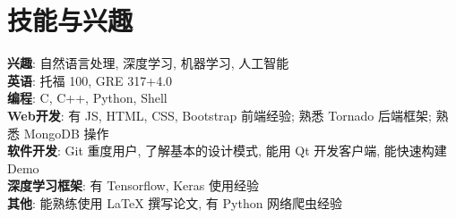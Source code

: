 \section{技能与兴趣}
\textbf{兴趣}: 自然语言处理, 深度学习, 机器学习, 人工智能\\
\textbf{英语}: 托福 100, GRE 317+4.0\\
\textbf{编程}: C, C++, Python, Shell\\
\textbf{Web开发}: 有 JS, HTML, CSS, Bootstrap 前端经验; 熟悉 Tornado 后端框架; 熟悉 MongoDB 操作\\
\textbf{软件开发}: Git 重度用户, 了解基本的设计模式, 能用 Qt 开发客户端, 能快速构建 Demo\\
\textbf{深度学习框架}: 有 Tensorflow, Keras 使用经验\\
\textbf{其他}: 能熟练使用 LaTeX 撰写论文, 有 Python 网络爬虫经验\\

